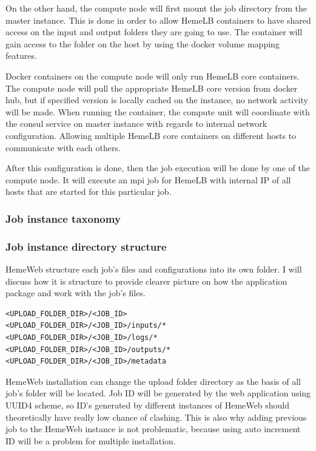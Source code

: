 On the other hand, the compute node will first mount the job directory from the master instance. This is done in order to allow HemeLB containers to have shared access on the input and output folders they are going to use. The container will gain access to the folder on the host by using the docker volume mapping features.

Docker containers on the compute node will only run HemeLB core containers. The compute node will pull the appropriate HemeLB core version from docker hub, but if specified version is locally cached on the instance, no network activity will be made. When running the container, the compute unit will coordinate with the consul service on master instance with regards to internal network configuration. Allowing multiple HemeLB core containers on different hosts to communicate with each others. 

After this configuration is done, then the job execution will be done by one of the compute node. It will execute an mpi job for HemeLB with internal IP of all hosts that are started for this particular job.


\subsubsection{Job instance taxonomy}


\subsubsection{Job instance directory structure}

HemeWeb structure each job's files and configurations into its own folder. I will discuss how it is structure to provide clearer picture on how the application package and work with the job's files.

\begin{lstlisting}
<UPLOAD_FOLDER_DIR>/<JOB_ID>
<UPLOAD_FOLDER_DIR>/<JOB_ID>/inputs/*
<UPLOAD_FOLDER_DIR>/<JOB_ID>/logs/*
<UPLOAD_FOLDER_DIR>/<JOB_ID>/outputs/*
<UPLOAD_FOLDER_DIR>/<JOB_ID>/metadata
\end{lstlisting}

HemeWeb installation can change the upload folder directory as the basis of all job's folder will be located.  Job ID will be generated by the web application using UUID4 scheme, so ID's generated by different instances of HemeWeb should theoretically have really low chance of clashing. This is also why adding previous job to the HemeWeb instance is not problematic, because using auto increment ID will be a problem for multiple installation.


